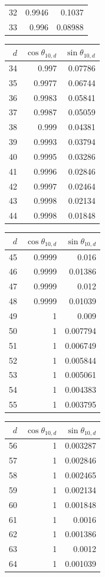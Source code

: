 {\begin{tabular}[t]{r|rr}
32 & 0.9946 & 0.1037 \\
33 & 0.996 & 0.08988
\end{tabular}\kern4pt
\begin{tabular}[t]{r|rr}
$d$ & $\cos\theta_{10,d}$ & $\sin\theta_{10,d}$ \\\hline
34 & 0.997 & 0.07786 \\
35 & 0.9977 & 0.06744 \\
36 & 0.9983 & 0.05841 \\
37 & 0.9987 & 0.05059 \\
38 & 0.999 & 0.04381 \\
39 & 0.9993 & 0.03794 \\
40 & 0.9995 & 0.03286 \\
41 & 0.9996 & 0.02846 \\
42 & 0.9997 & 0.02464 \\
43 & 0.9998 & 0.02134 \\
44 & 0.9998 & 0.01848
\end{tabular}\kern4pt
\begin{tabular}[t]{r|rr}
$d$ & $\cos\theta_{10,d}$ & $\sin\theta_{10,d}$ \\\hline
45 & 0.9999 & 0.016 \\
46 & 0.9999 & 0.01386 \\
47 & 0.9999 & 0.012 \\
48 & 0.9999 & 0.01039 \\
49 & 1 & 0.009 \\
50 & 1 & 0.007794 \\
51 & 1 & 0.006749 \\
52 & 1 & 0.005844 \\
53 & 1 & 0.005061 \\
54 & 1 & 0.004383 \\
55 & 1 & 0.003795
\end{tabular}\kern4pt
\begin{tabular}[t]{r|rr}
$d$ & $\cos\theta_{10,d}$ & $\sin\theta_{10,d}$ \\\hline
56 & 1 & 0.003287 \\
57 & 1 & 0.002846 \\
58 & 1 & 0.002465 \\
59 & 1 & 0.002134 \\
60 & 1 & 0.001848 \\
61 & 1 & 0.0016 \\
62 & 1 & 0.001386 \\
63 & 1 & 0.0012 \\
64 & 1 & 0.001039
\end{tabular}}

